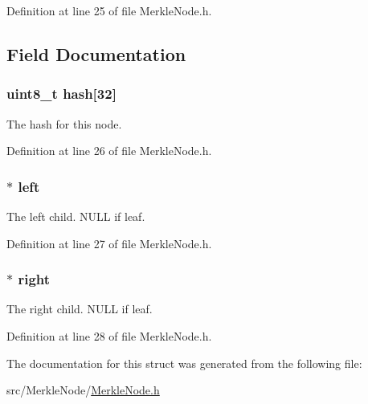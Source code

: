 Definition at line 25 of file MerkleNode.h.



\subsection{Field Documentation}
\hypertarget{struct_merkle_node_a7ff9da008bf055da1f1ba994c562057d}{
\subsubsection[{hash}]{\setlength{\rightskip}{0pt plus 5cm}uint8\_\-t {\bf hash}\mbox{[}32\mbox{]}}}
\label{struct_merkle_node_a7ff9da008bf055da1f1ba994c562057d}
The hash for this node. 

Definition at line 26 of file MerkleNode.h.

\hypertarget{struct_merkle_node_a3292e1ae6fbbb8666d2007bee45b69a1}{
\subsubsection[{left}]{$\ast$ {\bf left}}}
\label{struct_merkle_node_a3292e1ae6fbbb8666d2007bee45b69a1}
The left child. NULL if leaf. 

Definition at line 27 of file MerkleNode.h.

\hypertarget{struct_merkle_node_a131f273991e1615aab021dd945479c62}{
\subsubsection[{right}]{$\ast$ {\bf right}}}
\label{struct_merkle_node_a131f273991e1615aab021dd945479c62}
The right child. NULL if leaf. 

Definition at line 28 of file MerkleNode.h.



The documentation for this struct was generated from the following file:\begin{DoxyCompactItemize}
\item 
src/MerkleNode/\hyperlink{_merkle_node_8h}{MerkleNode.h}\end{DoxyCompactItemize}
